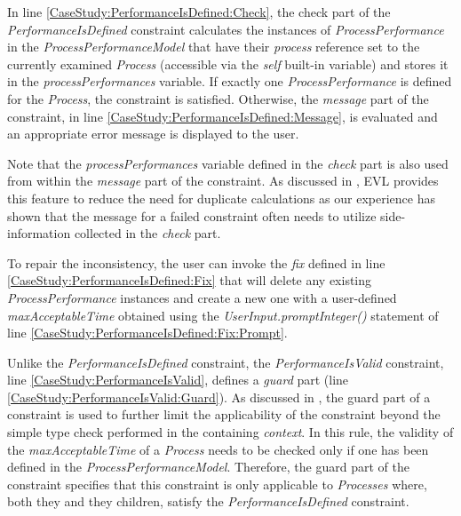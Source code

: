 In line \ref{CaseStudy:PerformanceIsDefined:Check}, the check part of the \emph{PerformanceIsDefined} constraint calculates the instances of \emph{ProcessPerformance} in the \emph{ProcessPerformanceModel} that have their \emph{process} reference set to the currently examined \emph{Process} (accessible via the \emph{self} built-in variable) and stores it in the \emph{processPerformances} variable. If exactly one \emph{ProcessPerformance} is defined for the \emph{Process}, the constraint is satisfied. Otherwise, the \emph{message} part of the constraint, in line \ref{CaseStudy:PerformanceIsDefined:Message}, is evaluated and an appropriate error message is displayed to the user. 

Note that the \emph{processPerformances} variable defined in the \emph{check} part is also used from within the \emph{message} part of the constraint. As discussed in \cite{EVL}, EVL provides this feature to reduce the need for duplicate calculations as our experience has shown that the message for a failed constraint often needs to utilize side-information collected in the \emph{check} part.

To repair the inconsistency, the user can invoke the \emph{fix} defined in line \ref{CaseStudy:PerformanceIsDefined:Fix} that will delete any existing \emph{ProcessPerformance} instances and create a new one with a user-defined \emph{maxAcceptableTime} obtained using the \emph{UserInput.promptInteger()} statement of line \ref{CaseStudy:PerformanceIsDefined:Fix:Prompt}.

Unlike the \emph{PerformanceIsDefined} constraint, the \emph{PerformanceIsValid} constraint, line \ref{CaseStudy:PerformanceIsValid}, defines a \emph{guard} part (line \ref{CaseStudy:PerformanceIsValid:Guard}). As discussed in \cite{EVL}, the guard part of a constraint is used to further limit the applicability of the constraint beyond the simple type check performed in the containing \emph{context}. In this rule, the validity of the \emph{maxAcceptableTime} of a \emph{Process} needs to be checked only if one has been defined in the \emph{ProcessPerformanceModel}. Therefore, the guard part of the constraint specifies that this constraint is only applicable to \emph{Processes} where, both they and they children, satisfy the \emph{PerformanceIsDefined} constraint.

